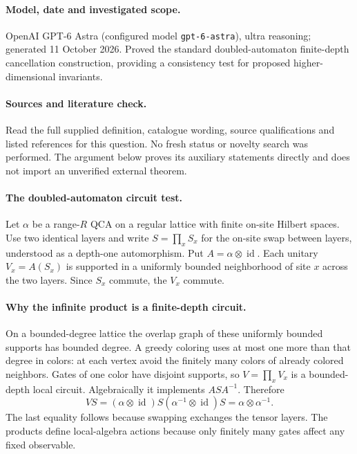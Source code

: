\documentclass[11pt]{article}
\begin{document}
\paragraph{Model, date and investigated scope.}
OpenAI GPT-6 Astra (configured model \texttt{gpt-6-astra}), ultra reasoning; generated 11 October 2026. Proved the standard doubled-automaton finite-depth cancellation construction, providing a consistency test for proposed higher-dimensional invariants.

\paragraph{Sources and literature check.}
Read the full supplied definition, catalogue wording, source qualifications and listed references for this question. No fresh status or novelty search was performed. The argument below proves its auxiliary statements directly and does not import an unverified external theorem.

\paragraph{The doubled-automaton circuit test.} Let \(\alpha\) be a range-\(R\) QCA on a regular lattice with finite on-site Hilbert spaces. Use two identical layers and write \(S=\prod_xS_x\) for the on-site swap between layers, understood as a depth-one automorphism. Put \(A=\alpha\otimes\operatorname{id}\). Each unitary \(V_x=A(S_x)\) is supported in a uniformly bounded neighborhood of site \(x\) across the two layers. Since \(S_x\) commute, the \(V_x\) commute.
\paragraph{Why the infinite product is a finite-depth circuit.} On a bounded-degree lattice the overlap graph of these uniformly bounded supports has bounded degree. A greedy coloring uses at most one more than that degree in colors: at each vertex avoid the finitely many colors of already colored neighbors. Gates of one color have disjoint supports, so \(V=\prod_xV_x\) is a bounded-depth local circuit. Algebraically it implements \(ASA^{-1}\). Therefore
\[
 VS=(\alpha\otimes\operatorname{id})S
 (\alpha^{-1}\otimes\operatorname{id})S
 =\alpha\otimes\alpha^{-1}.
\]
The last equality follows because swapping exchanges the tensor layers. The products define local-algebra actions because only finitely many gates affect any fixed observable.
\end{document}
